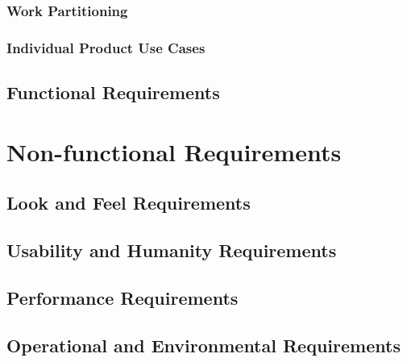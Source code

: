 \documentclass[12pt, titlepage]{article}
\begin{document}
\subsubsection{Work Partitioning}

\subsubsection{Individual Product Use Cases}

\subsection{Functional Requirements}

\section{Non-functional Requirements}

\subsection{Look and Feel Requirements}

\subsection{Usability and Humanity Requirements}

\subsection{Performance Requirements}

\subsection{Operational and Environmental Requirements}
\end{document}
